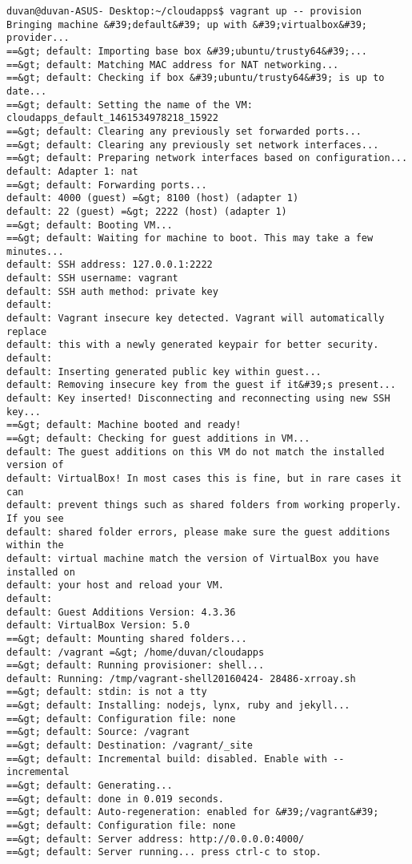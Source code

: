 \documentclass[10pt]{article}   			%
\begin{document}
\begin{enumerate}
	
\begin{small}
	\begin{lstlisting}[frame=single]	
duvan@duvan-ASUS- Desktop:~/cloudapps$ vagrant up -- provision
Bringing machine &#39;default&#39; up with &#39;virtualbox&#39; provider...
==&gt; default: Importing base box &#39;ubuntu/trusty64&#39;...
==&gt; default: Matching MAC address for NAT networking...
==&gt; default: Checking if box &#39;ubuntu/trusty64&#39; is up to date...
==&gt; default: Setting the name of the VM: cloudapps_default_1461534978218_15922
==&gt; default: Clearing any previously set forwarded ports...
==&gt; default: Clearing any previously set network interfaces...
==&gt; default: Preparing network interfaces based on configuration...
default: Adapter 1: nat
==&gt; default: Forwarding ports...
default: 4000 (guest) =&gt; 8100 (host) (adapter 1)
default: 22 (guest) =&gt; 2222 (host) (adapter 1)
==&gt; default: Booting VM...
==&gt; default: Waiting for machine to boot. This may take a few minutes...
default: SSH address: 127.0.0.1:2222
default: SSH username: vagrant
default: SSH auth method: private key
default:
default: Vagrant insecure key detected. Vagrant will automatically replace
default: this with a newly generated keypair for better security.
default:
default: Inserting generated public key within guest...
default: Removing insecure key from the guest if it&#39;s present...
default: Key inserted! Disconnecting and reconnecting using new SSH key...
==&gt; default: Machine booted and ready!
==&gt; default: Checking for guest additions in VM...
default: The guest additions on this VM do not match the installed version of
default: VirtualBox! In most cases this is fine, but in rare cases it can
default: prevent things such as shared folders from working properly. If you see
default: shared folder errors, please make sure the guest additions within the
default: virtual machine match the version of VirtualBox you have installed on
default: your host and reload your VM.
default:
default: Guest Additions Version: 4.3.36
default: VirtualBox Version: 5.0
==&gt; default: Mounting shared folders...
default: /vagrant =&gt; /home/duvan/cloudapps
==&gt; default: Running provisioner: shell...
default: Running: /tmp/vagrant-shell20160424- 28486-xrroay.sh
==&gt; default: stdin: is not a tty
==&gt; default: Installing: nodejs, lynx, ruby and jekyll...
==&gt; default: Configuration file: none
==&gt; default: Source: /vagrant
==&gt; default: Destination: /vagrant/_site
==&gt; default: Incremental build: disabled. Enable with -- incremental
==&gt; default: Generating...
==&gt; default: done in 0.019 seconds.
==&gt; default: Auto-regeneration: enabled for &#39;/vagrant&#39;
==&gt; default: Configuration file: none
==&gt; default: Server address: http://0.0.0.0:4000/
==&gt; default: Server running... press ctrl-c to stop.


\end{lstlisting}
\end{small}
\end{enumerate}
\end{document}
